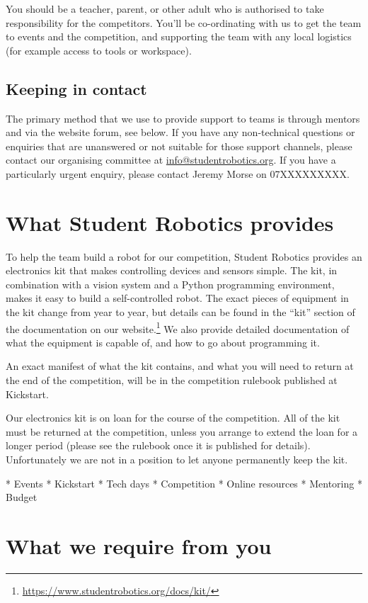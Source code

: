 \documentclass[a4paper]{article}
\begin{document}
You should be a teacher, parent, or other adult who is authorised to take
responsibility for the competitors. You'll be co-ordinating with us to get the
team to events and the competition, and supporting the team with any local
logistics (for example access to tools or workspace).

\subsection*{Keeping in contact}

The primary method that we use to provide support to teams is through mentors
and via the website forum, see below. If you have any non-technical questions
or enquiries that are unanswered or not suitable for those support channels,
please contact our organising committee at \url{info@studentrobotics.org}. If
you have a particularly urgent enquiry, please contact Jeremy Morse on
07XXXXXXXXX.

\section*{What Student Robotics provides}

To help the team build a robot for our competition, Student Robotics provides
an electronics kit that makes controlling devices and sensors simple. The kit,
in combination with a vision system and a Python programming environment,
makes it easy to build a self-controlled robot. The exact pieces of equipment
in the kit change from year to year, but details can be found in the ``kit''
section of the documentation on our
website.\footnote{\url{https://www.studentrobotics.org/docs/kit/}}
We also provide detailed documentation of what the equipment is capable of,
and how to go about programming it.

An exact manifest of what the kit contains, and what you will need to return
at the end of the competition, will be in the competition rulebook published
at Kickstart.

Our electronics kit is on loan for the course of the competition. All of the
kit must be returned at the competition, unless you arrange to extend the loan
for a longer period (please see the rulebook once it is published for details).
Unfortunately we are not in a position to let anyone permanently keep the kit.

 * Events
  * Kickstart
  * Tech days
  * Competition
 * Online resources
 * Mentoring
 * Budget

\section*{What we require from you}
\end{document}

